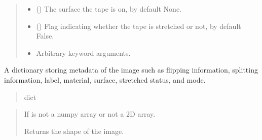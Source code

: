 \documentclass[letterpaper,10pt,english]{sphinxmanual}
\begin{document}
\begin{fulllineitems}
\begin{quote}
\begin{description}
\begin{itemize}
\item {} 
\sphinxAtStartPar
{} (\sphinxstyleliteralemphasis{\sphinxupquote{, }}) \textendash{} The surface the tape is on, by default None.

\item {} 
\sphinxAtStartPar
{} (\sphinxstyleliteralemphasis{\sphinxupquote{, }}) \textendash{} Flag indicating whether the tape is stretched or not, by default False.

\item {} 
\sphinxAtStartPar
{} \textendash{} Arbitrary keyword arguments.

\end{itemize}

\end{description}\end{quote}

\begin{fulllineitems}
\label{\detokenize{forensicfit.core.tape:forensicfit.core.tape.Tape.metadata}}
\pysigstartsignatures
{}
\pysigstopsignatures
\sphinxAtStartPar
A dictionary storing metadata of the image such as flipping information,
splitting information, label, material, surface, stretched status, and mode.
\begin{quote}\begin{description}
\sphinxAtStartPar
dict

\end{description}\end{quote}

\end{fulllineitems}

\begin{quote}\begin{description}
\sphinxAtStartPar
{} \textendash{} If  is not a numpy array or not a 2D array.

\begin{description}
\sphinxAtStartPar
Returns the shape of the image.


\end{description}
\end{description}
\end{quote}
\end{fulllineitems}
\end{document}
